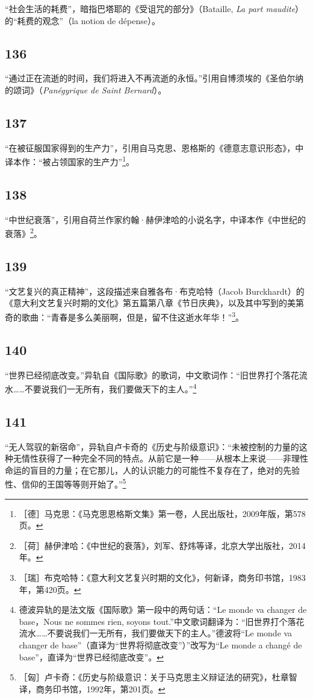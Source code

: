 \documentclass[fontset=fandol, a4paper, 12pt, openright]{ctexbook}
\begin{document}
“社会生活的耗费”，暗指巴塔耶的《受诅咒的部分》（Bataille, \textit{La part maudite}）的“耗费的观念”（la notion de dépense）。

\subsection*{136}
“通过正在流逝的时间，我们将进入不再流逝的永恒。”引用自博须埃的《圣伯尔纳的颂词》（\textit{Panégyrique de Saint Bernard}）。

\subsection*{137}
“在被征服国家得到的生产力”，引用自马克思、恩格斯的《德意志意识形态》，中译本作：“被占领国家的生产力”\footnote{［德］马克思：《马克思恩格斯文集》第一卷，人民出版社，2009年版，第578页。}。

\subsection*{138}
“中世纪衰落”，引用自荷兰作家约翰·赫伊津哈的小说名字，中译本作《中世纪的衰落》\footnote{［荷］赫伊津哈：《中世纪的衰落》，刘军、舒炜等译，北京大学出版社，2014年。}。

\subsection*{139}
“文艺复兴的真正精神”，这段描述来自雅各布·布克哈特（Jacob Burckhardt）的《意大利文艺复兴时期的文化》第五篇第八章《节日庆典》，以及其中写到的美第奇的歌曲：“青春是多么美丽啊，但是，留不住这逝水年华！”\footnote{［瑞］布克哈特：《意大利文艺复兴时期的文化》，何新译，商务印书馆，1983年，第420页。}。

\subsection*{140}
“世界已经彻底改变。”异轨自《国际歌》的歌词，中文歌词作：“旧世界打个落花流水……不要说我们一无所有，我们要做天下的主人。”\footnote{德波异轨的是法文版《国际歌》第一段中的两句话：“Le monde va changer de base，Nous ne sommes rien, soyons tout.”中文歌词翻译为：“旧世界打个落花流水……不要说我们一无所有，我们要做天下的主人。”德波将“Le monde va changer de base”（直译为“世界将彻底改变”）”改写为“Le monde a changé de base”，直译为“世界已经彻底改变”。}

\subsection*{141}
“无人驾驭的新宿命”，异轨自卢卡奇的《历史与阶级意识》：“未被控制的力量的这种无情性获得了一种完全不同的特点。从前它是一种——从根本上来说——非理性命运的盲目的力量；在它那儿，人的认识能力的可能性不复存在了，绝对的先验性、信仰的王国等等则开始了。”\footnote{［匈］卢卡奇：《历史与阶级意识：关于马克思主义辩证法的研究》，杜章智译，商务印书馆，1992年，第201页。}
\end{document}
